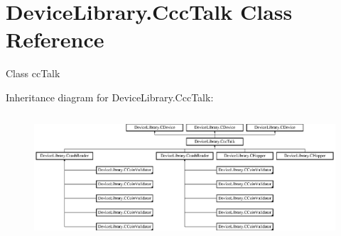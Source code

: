 \hypertarget{class_device_library_1_1_ccc_talk}{}\section{Device\+Library.\+Ccc\+Talk Class Reference}
\label{class_device_library_1_1_ccc_talk}


Class cc\+Talk  


Inheritance diagram for Device\+Library.\+Ccc\+Talk\+:\begin{figure}[H]
\begin{center}
\leavevmode
\includegraphics[height=4.691100cm]{class_device_library_1_1_ccc_talk}
\end{center}
\end{figure}
